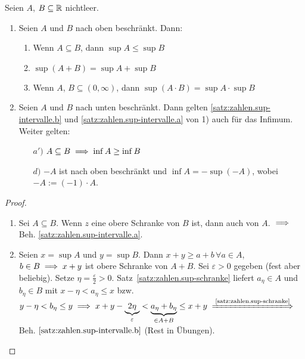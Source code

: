 \documentclass[12pt]{scrreprt}
\begin{document}
\begin{satz}\label{satz:zahlen.sup-intervalle}
Seien $A$, $B \subseteq \mathbb{R}$ nichtleer.
\begin{enumerate}
\item Seien $A$ und $B$ nach oben beschränkt. Dann:
	\begin{enumerate}
	\item \label{satz:zahlen.sup-intervalle.a}
		Wenn $A \subseteq B$, dann $\sup A \le \sup B$
	\item \label{satz:zahlen.sup-intervalle.b}
		$\sup (A+B) = \sup A + \sup B$
	\item \label{satz:zahlen.sup-intervalle.c}
		Wenn $A$, $B \subseteq (0, \infty)$, dann $\sup(A\cdot B) = \sup A \cdot \sup B$
	\end{enumerate}
\item Seien $A$ und $B$ nach unten beschränkt. Dann gelten
	\ref{satz:zahlen.sup-intervalle.b} und \ref{satz:zahlen.sup-intervalle.a} von 1) auch für das Infimum. Weiter gelten:
	\begin{itemize} %
	\item[$a')$] \label{satz:zahlen.sup-intervalle.a2}
	$A \subseteq B \implies \inf A \geq \inf B$
	\item[$d)$] \label{satz:zahlen.sup-intervalle.d}
	$-A$ ist nach oben beschränkt und $\inf A = -\sup(-A)$, wobei $-A:=(-1)\cdot A$.
	\end{itemize}
\end{enumerate}
\end{satz}
\begin{proof}
\begin{enumerate}
\item Sei $A\subseteq B$. Wenn $z$ eine obere Schranke von $B$ ist, dann auch von $A$. $\implies$ Beh. \ref{satz:zahlen.sup-intervalle.a}.
\item Seien $x=\sup A$ und $y = \sup B$. Dann $x+y\ge a+b\,\forall a \in A$, $b\in B \implies x+y $ ist obere Schranke von $A+B$. Sei $\varepsilon >0$
gegeben (fest aber beliebig). Setze  $\eta = \frac{\varepsilon}{2} > 0$. Satz~\ref{satz:zahlen.sup-schranke} liefert $a_\eta \in A$ und 
$b_\eta \in B$ mit $x-\eta < a_\eta \le x$ bzw. $y-\eta < b_\eta \le y
\folgt x+y-\underbrace{2\eta}_\varepsilon < \underbrace{a_\eta + b_\eta}_{\in A+B} \le x+y \folgtnach{\ref{satz:zahlen.sup-schranke}}$ Beh. $\ref{satz:zahlen.sup-intervalle.b}$
(Rest in Übungen).
\end{enumerate}
\end{proof}
\end{document}
